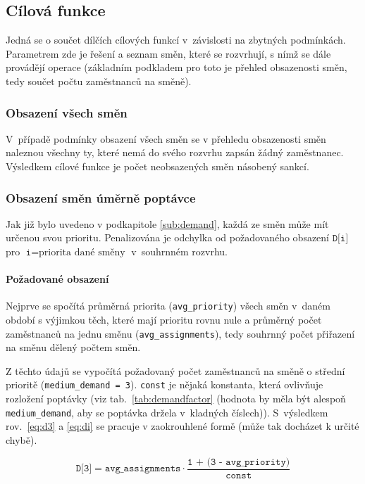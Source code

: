 \documentclass[twoside]{ctuthesis}
\begin{document}
\subsection{Cílová funkce}
Jedná se o součet dílčích cílových funkcí v~závislosti na zbytných podmínkách. Parametrem zde je řešení a seznam směn, které se rozvrhují, s nímž se dále provádějí operace (základním podkladem pro toto je přehled obsazenosti směn, tedy součet počtu zaměstnanců na směně).

\subsubsection{Obsazení všech směn}
V~případě podmínky obsazení všech směn se v přehledu obsazenosti směn naleznou všechny ty, které nemá do svého rozvrhu zapsán žádný zaměstnanec. Výsledkem cílové funkce je počet neobsazených směn násobený sankcí.

\subsubsection{Obsazení směn úměrně poptávce}
Jak již bylo uvedeno v podkapitole \ref{sub:demand}, každá ze směn může mít určenou svou prioritu. Penalizována je odchylka od požadovaného obsazení $\texttt{D[i]}$ pro $\texttt{i} = \mbox{priorita dané směny}$ v~souhrnném rozvrhu.

\paragraph{Požadované obsazení}
Nejprve se spočítá průměrná priorita (\texttt{avg\_priority}) všech směn v~daném období s výjimkou těch, které mají prioritu rovnu nule a průměrný počet zaměstnanců na jednu směnu (\texttt{avg\_assignments}), tedy souhrnný počet přiřazení na směnu dělený počtem směn.

Z těchto údajů se vypočítá požadovaný počet zaměstnanců na směně o střední prioritě (\texttt{medium\_demand = 3}). \texttt{const} je nějaká konstanta, která ovlivňuje rozložení poptávky (viz tab.~\ref{tab:demandfactor} (hodnota by měla být alespoň \texttt{medium\_demand}, aby se poptávka držela v~kladných číslech)). S~výsledkem rov.~\ref{eq:d3} a \ref{eq:di} se pracuje v zaokrouhlené formě (může tak docházet k určité chybě).

\begin{equation}
	\label{eq:d3}
	\texttt{D[3]} = \texttt{avg\_assignments} \cdot \frac{\texttt{1 + (3 - avg\_priority})}{\texttt{const}}
\end{equation}
\end{document}
